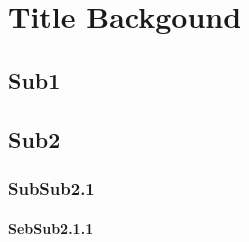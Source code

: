 

\chapter{Title Backgound}

\label{Label for title 6}

\section{Sub1}
\section{Sub2}
\subsection{SubSub2.1}
\subsubsection{SebSub2.1.1}